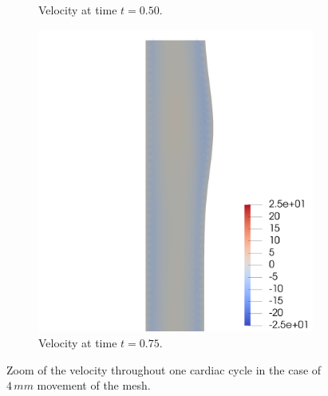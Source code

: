 \documentclass[a4paper,11pt,openright,twoside]{book}
\begin{document}
\begin{figure}[h!]
\begin{subfigure}[b]{0.5\linewidth}
        \centering
    \caption{Velocity at time $t = 0.50$.} 
    \label{fig2:c} 
  \end{subfigure}%
  \begin{subfigure}[b]{0.5\linewidth}
    \centering
    \includegraphics[width=1.2\linewidth]{images/velocity_30_075.png} 
        \centering
    \caption{Velocity at time $t = 0.75$.} 
    \label{fig2:d} 
  \end{subfigure} 
  \centering
  \caption{Zoom of the velocity throughout one cardiac cycle in the case of $4 \, mm$ movement of the mesh.}
  \label{fig2} 
\end{figure}
\end{document}
